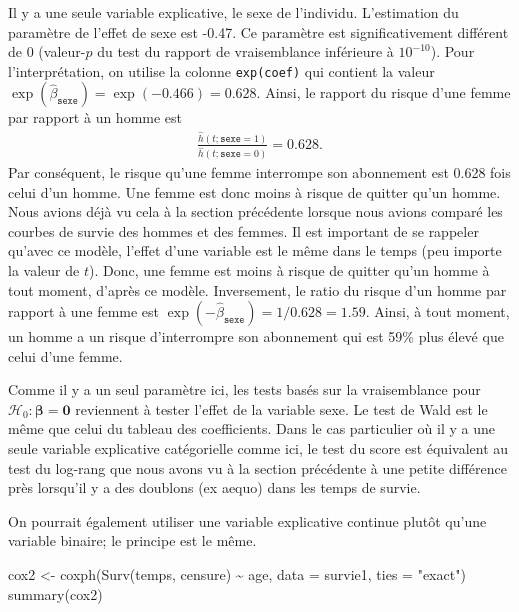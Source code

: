 \documentclass[
  11pt,
  letterpaper,
]{scrbook}
\newenvironment{Shaded}{\begin{snugshade}}{\end{snugshade}}
\newcommand{\AttributeTok}[1]{\textcolor[rgb]{0.40,0.45,0.13}{#1}}
\newcommand{\FunctionTok}[1]{\textcolor[rgb]{0.28,0.35,0.67}{#1}}
\newcommand{\NormalTok}[1]{\textcolor[rgb]{0.00,0.23,0.31}{#1}}
\newcommand{\OtherTok}[1]{\textcolor[rgb]{0.00,0.23,0.31}{#1}}
\newcommand{\SpecialCharTok}[1]{\textcolor[rgb]{0.37,0.37,0.37}{#1}}
\newcommand{\StringTok}[1]{\textcolor[rgb]{0.13,0.47,0.30}{#1}}
\theoremstyle{definition}
\theoremstyle{remark}
\begin{document}
Il y a une seule variable explicative, le sexe de l'individu.
L'estimation du paramètre de l'effet de sexe est -0.47. Ce paramètre est
significativement différent de \(0\) (valeur-\(p\) du test du rapport de
vraisemblance inférieure à \(10^{-10}\)). Pour l'interprétation, on
utilise la colonne \texttt{exp(coef)} qui contient la valeur
\(\exp(\hat{\beta}_{\texttt{sexe}}) = \exp(-0.466) = 0.628\). Ainsi, le
rapport du risque d'une femme par rapport à un homme est \begin{align*}
 \frac{\hat{h}(t; \texttt{sexe}=1)}{\hat{h}(t; \texttt{sexe}=0)}= 0.628.
\end{align*} Par conséquent, le risque qu'une femme interrompe son
abonnement est 0.628 fois celui d'un homme. Une femme est donc moins à
risque de quitter qu'un homme. Nous avions déjà vu cela à la section
précédente lorsque nous avions comparé les courbes de survie des hommes
et des femmes. Il est important de se rappeler qu'avec ce modèle,
l'effet d'une variable est le même dans le temps (peu importe la valeur
de \(t\)). Donc, une femme est moins à risque de quitter qu'un homme à
tout moment, d'après ce modèle. Inversement, le ratio du risque d'un
homme par rapport à une femme est
\(\exp(-\hat{\beta}_{\texttt{sexe}}) = 1/0.628=1.59\). Ainsi, à tout
moment, un homme a un risque d'interrompre son abonnement qui est 59\%
plus élevé que celui d'une femme.

Comme il y a un seul paramètre ici, les tests basés sur la vraisemblance
pour \(\mathscr{H}_0: \boldsymbol{\beta}=\boldsymbol{0}\) reviennent à
tester l'effet de la variable sexe. Le test de Wald est le même que
celui du tableau des coefficients. Dans le cas particulier où il y a une
seule variable explicative catégorielle comme ici, le test du score est
équivalent au test du log-rang que nous avons vu à la section précédente
à une petite différence près lorsqu'il y a des doublons (ex aequo) dans
les temps de survie.

On pourrait également utiliser une variable explicative continue plutôt
qu'une variable binaire; le principe est le même.

\begin{Shaded}
\begin{Highlighting}[]
\NormalTok{cox2 }\OtherTok{\textless{}{-}} \FunctionTok{coxph}\NormalTok{(}\FunctionTok{Surv}\NormalTok{(temps, censure) }\SpecialCharTok{\textasciitilde{}}\NormalTok{ age, }
              \AttributeTok{data =}\NormalTok{ survie1,}
              \AttributeTok{ties =} \StringTok{"exact"}\NormalTok{)}
\FunctionTok{summary}\NormalTok{(cox2)}
\end{Highlighting}
\end{Shaded}
\end{document}
